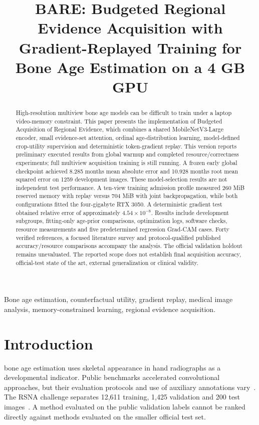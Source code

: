 \documentclass[nolineno]{ieeeaccess}
\begin{document}
\doi{}
\title{BARE: Budgeted Regional Evidence Acquisition with Gradient-Replayed Training for Bone Age Estimation on a 4 GB GPU}
\author{}
\address{}
\corresp{}
\begin{abstract}
High-resolution multiview bone age models can be difficult to train under a laptop video-memory constraint. This paper presents the implementation of Budgeted Acquisition of Regional Evidence, which combines a shared MobileNetV3-Large encoder, small evidence-set attention, ordinal age-distribution learning, model-defined crop-utility supervision and deterministic token-gradient replay. This version reports preliminary executed results from global warmup and completed resource/correctness experiments; full multiview acquisition training is still running. A frozen early global checkpoint achieved 8.285 months mean absolute error and 10.928 months root mean squared error on 1259 development images. These model-selection results are not independent test performance. A ten-view training admission profile measured 260 MiB reserved memory with replay versus 704 MiB with joint backpropagation, while both configurations fitted the four-gigabyte RTX 3050. A deterministic gradient test obtained relative error of approximately $4.54\times10^{-8}$. Results include development subgroups, fitting-only age-prior comparisons, optimization logs, software checks, resource measurements and five predetermined regression Grad-CAM cases. Forty verified references, a focused literature survey and protocol-qualified published accuracy/resource comparisons accompany the analysis. The official validation holdout remains unevaluated. The reported scope does not establish final acquisition accuracy, official-test state of the art, external generalization or clinical validity.
\end{abstract}
\begin{keywords}Bone age estimation, counterfactual utility, gradient replay, medical image analysis, memory-constrained learning, regional evidence acquisition.\end{keywords}
\titlepgskip=-15pt
\maketitle

\section{Introduction}
 bone age estimation uses skeletal appearance in hand radiographs as a developmental indicator. Public benchmarks accelerated convolutional approaches, but their evaluation protocols and use of auxiliary annotations vary~\cite{halabi,larson,spampinato,lee,iglovikov,bonexpert}. The RSNA challenge separates 12,611 training, 1,425 validation and 200 test images~\cite{halabi}. A method evaluated on the public validation labels cannot be ranked directly against methods evaluated on the smaller official test set.
\end{document}
